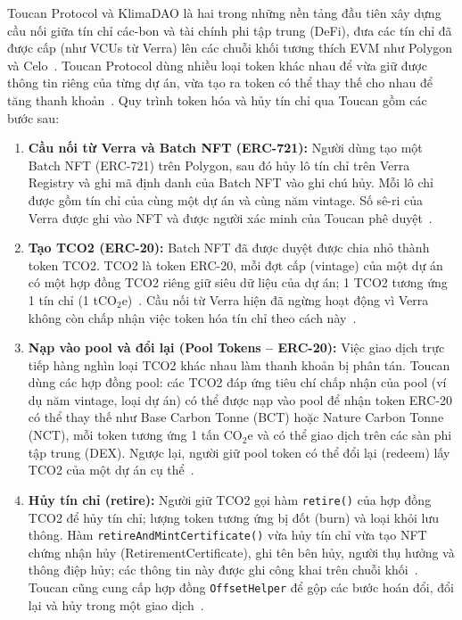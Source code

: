 Toucan Protocol và KlimaDAO là hai trong những nền tảng đầu tiên xây dựng cầu nối giữa tín chỉ các-bon và tài chính phi tập trung (DeFi), đưa các tín chỉ đã được cấp (như VCUs từ Verra) lên các chuỗi khối tương thích EVM như Polygon và Celo~\cite{toucan2025docs}. Toucan Protocol dùng nhiều loại token khác nhau để vừa giữ được thông tin riêng của từng dự án, vừa tạo ra token có thể thay thế cho nhau để tăng thanh khoản~\cite{toucan2025docs}. Quy trình token hóa và hủy tín chỉ qua Toucan gồm các bước sau:

\begin{enumerate}
    \item \textbf{Cầu nối từ Verra và Batch NFT (ERC-721):} Người dùng tạo một Batch NFT (ERC-721) trên Polygon, sau đó hủy lô tín chỉ trên Verra Registry và ghi mã định danh của Batch NFT vào ghi chú hủy. Mỗi lô chỉ được gồm tín chỉ của cùng một dự án và cùng năm vintage. Số sê-ri của Verra được ghi vào NFT và được người xác minh của Toucan phê duyệt~\cite{toucan2025docs}.
    \item \textbf{Tạo TCO2 (ERC-20):} Batch NFT đã được duyệt được chia nhỏ thành token TCO2. TCO2 là token ERC-20, mỗi đợt cấp (vintage) của một dự án có một hợp đồng TCO2 riêng giữ siêu dữ liệu của dự án; 1 TCO2 tương ứng 1 tín chỉ (1 tCO$_2$e)~\cite{toucan2025docs}. Cầu nối từ Verra hiện đã ngừng hoạt động vì Verra không còn chấp nhận việc token hóa tín chỉ theo cách này~\cite{toucan2025docs}.
    \item \textbf{Nạp vào pool và đổi lại (Pool Tokens -- ERC-20):} Việc giao dịch trực tiếp hàng nghìn loại TCO2 khác nhau làm thanh khoản bị phân tán. Toucan dùng các hợp đồng pool: các TCO2 đáp ứng tiêu chí chấp nhận của pool (ví dụ năm vintage, loại dự án) có thể được nạp vào pool để nhận token ERC-20 có thể thay thế như Base Carbon Tonne (BCT) hoặc Nature Carbon Tonne (NCT), mỗi token tương ứng 1 tấn CO$_2$e và có thể giao dịch trên các sàn phi tập trung (DEX). Ngược lại, người giữ pool token có thể đổi lại (redeem) lấy TCO2 của một dự án cụ thể~\cite{toucan2025docs}.
    \item \textbf{Hủy tín chỉ (retire):} Người giữ TCO2 gọi hàm \texttt{retire()} của hợp đồng TCO2 để hủy tín chỉ; lượng token tương ứng bị đốt (burn) và loại khỏi lưu thông. Hàm \texttt{retireAndMintCertificate()} vừa hủy tín chỉ vừa tạo NFT chứng nhận hủy (RetirementCertificate), ghi tên bên hủy, người thụ hưởng và thông điệp hủy; các thông tin này được ghi công khai trên chuỗi khối~\cite{toucan2025docs}. Toucan cũng cung cấp hợp đồng \texttt{OffsetHelper} để gộp các bước hoán đổi, đổi lại và hủy trong một giao dịch~\cite{toucan2025docs}.
\end{enumerate}

